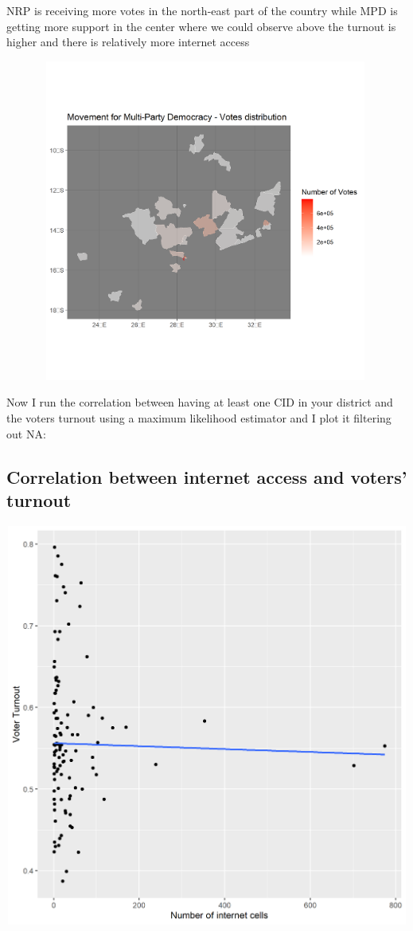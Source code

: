 \documentclass[
]{article}
\begin{document}
NRP is receiving more votes in the north-east part of the country while
MPD is getting more support in the center where we could observe above
the turnout is higher and there is relatively more internet access

\includegraphics[width=5.20833in,height=4.16667in]{add.png}

Now I run the correlation between having at least one CID in your
district and the voters turnout using a maximum likelihood estimator and
I plot it filtering out NA:

\hypertarget{correlation-between-internet-access-and-voters-turnout}{%
\subsection{Correlation between internet access and voters'
turnout}\label{correlation-between-internet-access-and-voters-turnout}}

\includegraphics[width=6.25in,height=5.20833in]{lm.png}
\end{document}
